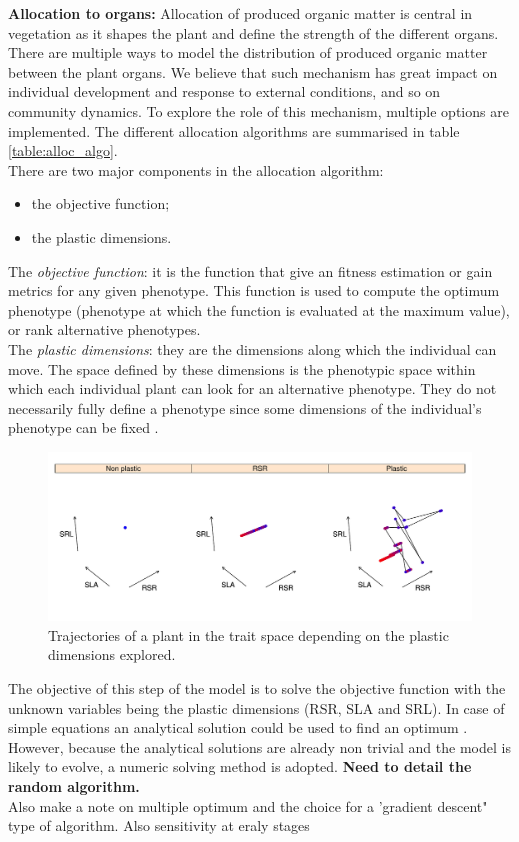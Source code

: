 \textbf{Allocation to organs:} Allocation of produced organic matter is central in vegetation as it shapes the plant and define the strength of the different organs. There are multiple ways to model the distribution of produced organic matter between the plant organs. We believe that such mechanism has great impact on individual development and response to external conditions, and so on community dynamics. To explore the role of this mechanism, multiple options are implemented. The different allocation algorithms are summarised in table \ref{table:alloc_algo}.\\
\indent There are two major components in the allocation algorithm:
\begin{itemize}
\item the objective function;
\item the plastic dimensions.
\end{itemize}
The \textit{objective function}: it is the function that give an fitness estimation or gain metrics for any given phenotype. This function is used to compute the optimum phenotype (phenotype at which the function is evaluated at the maximum value), or rank alternative phenotypes. \\
The \textit{plastic dimensions}: they are the dimensions along which the individual can move. The space defined by these dimensions is the phenotypic space within which each individual plant can look for an alternative phenotype. They do not necessarily fully define a phenotype since some dimensions of the individual's phenotype can be fixed . \\
\begin{figure}
\includegraphics{./Figures/strategy_space_algo.pdf}
\caption{Trajectories of a plant in the trait space depending on the plastic dimensions explored.}
\end{figure}
\indent The objective of this step of the model is to solve the objective function with the unknown variables being the plastic dimensions (RSR, SLA and SRL). In case of simple equations an analytical solution could be used to find an optimum . However, because the analytical solutions are already non trivial and the model is likely to evolve, a numeric solving method is adopted. \textbf{Need to detail the random algorithm.}\\
Also make a note on multiple optimum and the choice for a 'gradient descent" type of algorithm. Also sensitivity at eraly stages 

